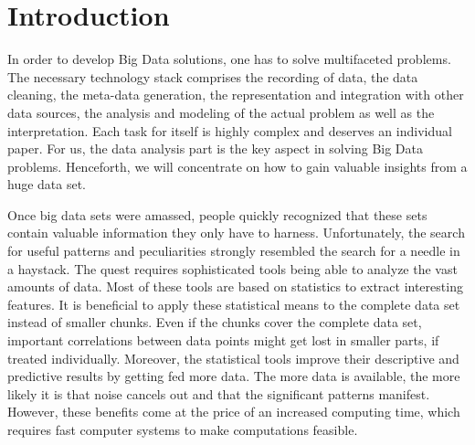 \section{Introduction}

In order to develop Big Data solutions, one has to solve multifaceted problems.
The necessary technology stack comprises the recording of data, the data cleaning, the meta-data generation, the representation and integration with other data sources, the analysis and modeling of the actual problem as well as the interpretation.
Each task for itself is highly complex and deserves an individual paper.
For us, the data analysis part is the key aspect in solving Big Data problems.
Henceforth, we will concentrate on how to gain valuable insights from a huge data set.

Once big data sets were amassed, people quickly recognized that these sets contain valuable information they only have to harness.
Unfortunately, the search for useful patterns and peculiarities strongly resembled the search for a needle in a haystack.
The quest requires sophisticated tools being able to analyze the vast amounts of data.
Most of these tools are based on statistics to extract interesting features.
It is beneficial to apply these statistical means to the complete data set instead of smaller chunks.
Even if the chunks cover the complete data set, important correlations between data points might get lost in smaller parts, if treated individually.
Moreover, the statistical tools improve their descriptive and predictive results by getting fed more data.
The more data is available, the more likely it is that noise cancels out and that the significant patterns manifest.
However, these benefits come at the price of an increased computing time, which requires fast computer systems to make computations feasible.

